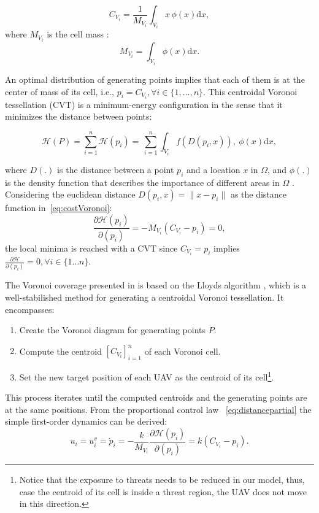 \begin{equation} \label{eq:centroidalVoronoi}
\mathit{C}_{V_i}=\frac{1}{{M}_{V_i}}\int_{V_i} \mathit{x} \, \phi(x)\mathrm{d}\mathit{x},
\end{equation}
where ${M}_{V_i}$ is the cell mass  \cite{breitenmoser2010}: 
\begin{equation} \label{eq:mass}
{M}_{V_i}=\int_{V_i} \phi(x)\mathrm{d}\mathit{x}.
\end{equation}

An optimal distribution of generating points implies that each of them is at the center of mass of its cell, i.e., $p_i = C_{V_i}, \forall i \in \{1,\dots,n\}$. This centroidal Voronoi tessellation (CVT) is a minimum-energy configuration in the sense that it minimizes the distance between points: 

\begin{equation} \label{eq:costVoronoi}
\mathscr{H}(P)=\sum_{i=1}^{n}\mathscr{H}(p_i) = \, \sum_{i=1}^{n}\int_{V_i} f(D(\mathit{p_i},\mathit{x})) ,\ \phi(x)\mathrm{d}\mathit{x},
\end{equation}

where $D(.)$ is the distance between a point $p_i$ and a location $x$ in $\Omega$, and $\phi(.)$  is the density function that describes the importance of different areas in $\Omega$ \cite{breitenmoser2010}. Considering the euclidean distance $D(p_i,x)=\|x-p_i\|$ as the distance function in~\eqref{eq:costVoronoi}:
\begin{equation} \label{eq:distancepartial}
\frac{\partial\mathscr{H}(p_i)}{\partial(p_i)}=-M_{V_i}(\mathit{C}_{V_i}-p_i)=0,
\end{equation}
the local minima is reached with a CVT since $\mathit{C}_{V_i}=p_i$ implies $\frac{\partial\mathscr{H}}{\partial(p_i)}=0, \forall i \in \{1 \dots n\}$.

The Voronoi coverage presented in \cite{breitenmoser2010} is based on the Lloyds algorithm \cite{du_2006}, which is a well-stabilished method for generating a centroidal Voronoi tessellation. It encompasses:    
\begin{enumerate}
	\item Create the Voronoi diagram for generating points $P$.
	\item Compute the centroid $[\mathit{C}_{V_i}]_{i=1}^n$ of each Voronoi cell.
	\item Set the new target position of each UAV as the centroid of its cell\footnote{Notice that the exposure to threats needs to be reduced in our model, thus, case the  centroid of its cell is inside a threat region, the UAV does not move in this direction.}.	 
\end{enumerate}
This process iterates until the computed centroids and the generating points are at the same positions. From the proportional control law  
~\eqref{eq:distancepartial} the simple first-order dynamics can be derived:
\begin{equation} \label{eq:derivatepartial}
u_i = u_i^v=\dot{p}_i=-\frac{k}{M_{V_i}}\frac{\partial\mathscr{H}(p_i)}{\partial(p_i)}=k(\mathit{C}_{V_i}-p_i).
\end{equation}

